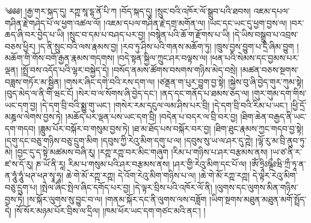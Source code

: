 \setcounter{footnote}{0} 
༄༅༅། །རྒྱ་གར་སྐད་དུ། རཀྵ་སཱ་དྷ་ནོ་པི་ཀ །བོད་སྐད་དུ། །སྲུང་བའི་འཁོར་ལོ་སྒྲུབ་པའི་ཐབས། འཇམ་དཔལ་གཤིན་རྗེ་གཤེད་པོ་ལ་ཕྱག་འཚལ་ལོ། །འཇམ་དཔལ་གཤིན་རྗེ་དགྲ་མགོན་ལ། །ཡང་དང་ཡང་དུ་ཕྱག་བྱས་ལ། །བར་ཆད་ཞི་བར་བྱེད་པ་ཡི། །སྲུང་བ་དམ་པ་བཤད་པར་བྱ། །བསྙེན་པའི་ཆོ་ག་རྫོགས་པ་ཡི། །དེ་ཡིས་བསྒྲུབ་པ་འབྲས་བཅས་ཕྱིར། །ད་ནི་སྲུང་བའི་ལས་རྣམས་བྱ། །རབ་ཏུ་ཤིས་པའི་གནས་མཆོག་ཏུ། །ཁྲུས་བྱས་བྱུག་པ་དྲི་ཞིམ་བྱུག །མཆོག་གི་གོས་བགོ་རྒྱན་རྣམས་གདགས། །བདེ་སྟན་སྐྱིལ་ཀྲུང་ཤར་བལྟས་ལ། །ཕན་པའི་སེམས་དང་བྱམས་པར་ལྡན། །སྤྲོ་བས་འདོད་པའི་ལྷར་བསྐྱེད་དེ། །བསོད་ནམས་ཚོགས་བསགས་གཉིས་མེད་བསྲེ། །མཚན་བཅས་སྔགས་བཟླས་གཏོར་མ་སྦྱིན། །གསར་ཞིང་དགེ་བའི་རས་དག་ལ། །ཙནྡན་ག་པུར་བྱུག་བྱ་སྟེ། །སྐྱེས་བུ་ཞི་བྱེད་གུར་ཀུམ་སྟེ། །བུད་མེད་ལ་ནི་གི་ཝང་ངོ། །སེར་བ་ལ་སོགས་ཞི་བྱེད་དང་། །ནད་དང་གནོད་པ་ཐམས་ཅད་ལ། །གུར་གུམ་དག་གིས་ཡང་དག་བྱ། །དེ་དག་བྲི་བའི་སྨྱུ་གུ་ཡང་། །གསེར་རམ་དངུལ་ལམ་ཤིས་པར་བྲི། །དེ་དག་བྲི་བའི་རིམ་པ་ཡང་། །ཕྱི་དྲོ་མཎྜལ་ལེགས་བྱས་ཏེ། །མཆོད་པར་ལྡན་པས་ཡང་དག་བྲི། །བདེན་པ་བདར་ལ་བྲི་བར་བྱ། །ཐིག་ཆེན་བརྒྱད་ནི་ཡང་དག་གདབ། །ཟླུམ་པོར་བསྐོར་བ་གསུམ་བྱས་ཏེ། །ཐ་མ་ཐོད་པས་བསྐོར་བར་བྱ། །ཐིག་ཐུང་རྣམས་ཀྱང་གདབ་བྱ་སྟེ། །དགུ་དང་བཅུ་གཉིས་བཅུ་དྲུག་མིག །དབུས་ཀྱི་རེའུ་མིག་དགུ་པ་ལ། །དབུས་སུ་ཡ་ལ་ཤར་དུ་ཀྵེ། །ལྷོ་རུ་མ་བྲི་ནུབ་ཏུ་མེ། །བྱང་དུ་ད་སྟེ་མཚམས་བཞི་རུ། །རཀྵ་རཀྵ་བར་མིང་གཞུག །རིམ་པ་གཉིས་པ་ཤར་བརྩམས་ནས། །ཡ་ཙ་ནི་ར་ཛ་ས་དོ་རུ། ཎ་ཡོ་ནི་རཱ། རིམ་པ་གསུམ་པའི་ཤར་བརྩམས་ནས། །ཤར་གྱི་རེའུ་མིག་དང་པོ་ལ། །ཨོཾ་ཧྲཱིཿཥྚྲྀཿཝི་ཀྲྀ་ཏཱ་ན་ན་ཧཱུཾ་ཧཱུཾ་ཕཊ་ཕཊ་སྭཱ་ཧཱ། ཆེ་གེ་མོ་རཀྵ་རཀྵ། དེ་འོག་རེའུ་མིག་གཉིས་པ་ལ། །ཆེ་གེ་མོ་རཀྵ་རཀྵ། དེ་ལྟར་རེའུ་མིག་བཅུ་དྲུག་པ། །སྤེལ་ཞིང་སྤེལ་ཞིང་དགོད་པར་བྱ། །དེ་ལྟར་བྲིས་པའི་འཁོར་ལོ་ནི། །ལུགས་དང་ལུགས་མིན་གཉིས་བྱས་ཏེ། །ས་སྐོར་ལུགས་སུ་བྱུང་བ་ལ། །གནམ་སྐོར་དང་ནི་ལུགས་ལས་བཟློག །ཡིག་སྔགས་མཐུན་མཐུན་མགོ་སྤྲོད་དེ། །སོ་སོར་མཉམ་པོར་བྲིས་ལ་དྲིལ། །ཁམ་ཕོར་ཡང་དག་གཙང་མའི་ནང་། །
